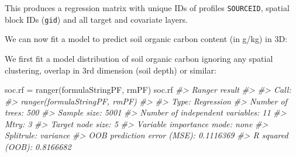 \documentclass[
  graybox,natbib,nospthms]{svmono}
\newenvironment{Shaded}{\begin{snugshade}}{\end{snugshade}}
\newcommand{\AttributeTok}[1]{\textcolor[rgb]{0.61,0.61,0.61}{#1}}
\newcommand{\CommentTok}[1]{\textcolor[rgb]{0.37,0.37,0.37}{\textit{#1}}}
\newcommand{\DecValTok}[1]{\textcolor[rgb]{0.06,0.06,0.06}{#1}}
\newcommand{\FunctionTok}[1]{\textcolor[rgb]{0,0,0}{#1}}
\newcommand{\NormalTok}[1]{#1}
\newcommand{\OtherTok}[1]{\textcolor[rgb]{0.37,0.37,0.37}{#1}}
\newcommand{\SpecialCharTok}[1]{\textcolor[rgb]{0,0,0}{#1}}
\newcommand{\StringTok}[1]{\textcolor[rgb]{0.5,0.5,0.5}{#1}}
\begin{document}
This produces a regression matrix with unique IDs of profiles \texttt{SOURCEID}, spatial
block IDs (\texttt{gid}) and all target and covariate layers.

We can now fit a model to predict soil organic carbon content (in g/kg) in 3D:

\begin{Shaded}
\end{Shaded}

We first fit a model distribution of soil organic carbon ignoring any spatial
clustering, overlap in 3rd dimension (soil depth) or similar:

\begin{Shaded}
\begin{Highlighting}[]
\NormalTok{soc.rf }\OtherTok{=} \FunctionTok{ranger}\NormalTok{(formulaStringPF, rmPF)}
\NormalTok{soc.rf}
\CommentTok{\#\textgreater{} Ranger result}
\CommentTok{\#\textgreater{} }
\CommentTok{\#\textgreater{} Call:}
\CommentTok{\#\textgreater{}  ranger(formulaStringPF, rmPF) }
\CommentTok{\#\textgreater{} }
\CommentTok{\#\textgreater{} Type:                             Regression }
\CommentTok{\#\textgreater{} Number of trees:                  500 }
\CommentTok{\#\textgreater{} Sample size:                      5001 }
\CommentTok{\#\textgreater{} Number of independent variables:  11 }
\CommentTok{\#\textgreater{} Mtry:                             3 }
\CommentTok{\#\textgreater{} Target node size:                 5 }
\CommentTok{\#\textgreater{} Variable importance mode:         none }
\CommentTok{\#\textgreater{} Splitrule:                        variance }
\CommentTok{\#\textgreater{} OOB prediction error (MSE):       0.1116369 }
\CommentTok{\#\textgreater{} R squared (OOB):                  0.8166682}
\end{Highlighting}
\end{Shaded}
\end{document}
